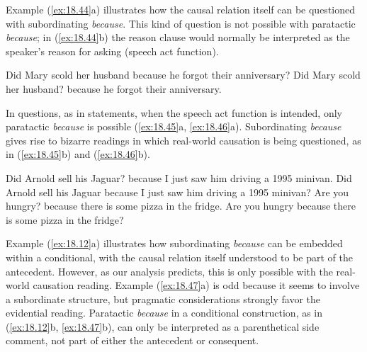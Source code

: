 Example (\ref{ex:18.44}a) illustrates how the causal relation itself can be questioned with subordinating \textit{because}. This kind of question is not possible with paratactic \textit{because}; in (\ref{ex:18.44}b) the reason clause would normally be interpreted as the speaker’s reason for asking (speech act function).


\ea \label{ex:18.44}
\ea  Did Mary scold her husband because he forgot their anniversary?
\ex Did Mary scold her husband? because he forgot their anniversary.
                       \z
\z


In questions, as in statements, when the speech act function is intended, only paratactic \textit{because} is possible (\ref{ex:18.45}a, \ref{ex:18.46}a). Subordinating \textit{because} gives rise to bizarre readings in which real-world causation is being questioned, as in (\ref{ex:18.45}b) and (\ref{ex:18.46}b).


\ea \label{ex:18.45}
\ea  Did Arnold sell his Jaguar? because I just saw him driving a 1995 minivan.
\ex Did Arnold sell his Jaguar because I just saw him driving a 1995 minivan?
                       \z
\ex \label{ex:18.46}
\ea  Are you hungry? because there is some pizza in the fridge.
\ex Are you hungry because there is some pizza in the fridge?
                       \z
\z


Example (\ref{ex:18.12}a) illustrates how subordinating \textit{because} can be embedded within a conditional, with the causal relation itself understood to be part of the antecedent. However, as our analysis predicts, this is only possible with the real-world causation reading. Example (\ref{ex:18.47}a) is odd because it seems to involve a subordinate structure, but pragmatic considerations strongly favor the evidential reading. Paratactic \textit{because} in a conditional construction, as in (\ref{ex:18.12}b, \ref{ex:18.47}b), can only be interpreted as a parenthetical side comment, not part of either the antecedent or consequent.


\ea \label{ex:18.12}
\z 
\ex \label{ex:18.47}
\z \z


